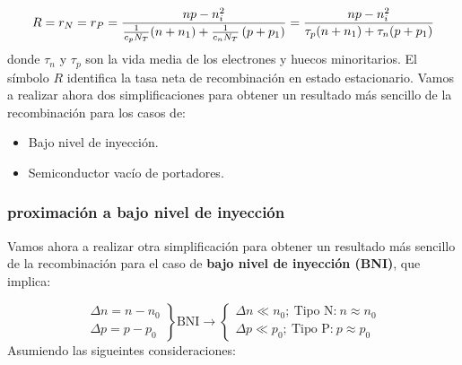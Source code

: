 \begin{equation}
	R=r_N=r_P = \frac{np-n_i^2}{\frac{1}{c_p N_T} (n+n_1) + \frac{1}{c_nN_T}\left( p+p_1 \right)} =
	\frac{np-n_i^2}{\tau_p(n+n_1)+\tau_n(p+p_1)}
\end{equation}
donde $\tau_n$ y $\tau_p$ son la vida media de los electrones y huecos minoritarios. El símbolo $R$ identifica la tasa neta de recombinación en estado estacionario. Vamos a realizar ahora dos simplificaciones para obtener un resultado más sencillo de la recombinación para los casos de:

\begin{itemize}
	\item Bajo nivel de inyección.
	\item Semiconductor vacío de portadores.
\end{itemize}

\subsubsection{proximación a bajo nivel de inyección}

Vamos ahora a realizar otra simplificación para obtener un resultado más sencillo de la recombinación para el caso de \textbf{bajo nivel de inyección (BNI)}, que implica: 

\begin{equation}
	\left.
	\begin{matrix}
		\Delta n = n - n_0 \\
		\Delta p = p - p_0
	\end{matrix}
	\right\rbrace
	\text{BNI} \rightarrow
	\left\lbrace
	\begin{matrix}
		\Delta n \ll n_0; \ \text{Tipo N:} \ n \approx n_0 \\
		\Delta p \ll p_0; \ \text{Tipo P:} \ p \approx p_0
	\end{matrix}
	\right.
\end{equation}
Asumiendo las sigueintes consideraciones:

